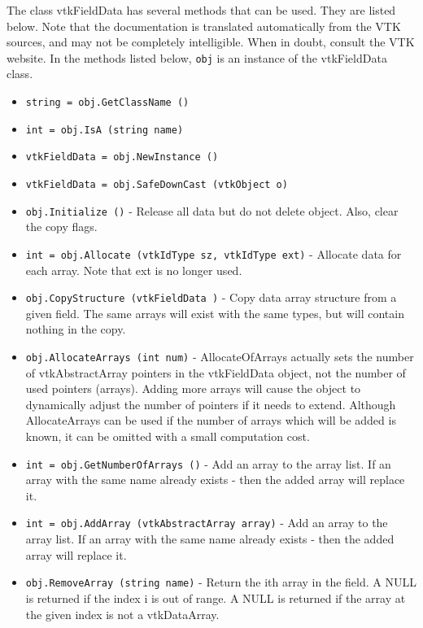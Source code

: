 The class vtkFieldData has several methods that can be used.
  They are listed below.
Note that the documentation is translated automatically from the VTK sources,
and may not be completely intelligible.  When in doubt, consult the VTK website.
In the methods listed below, \verb|obj| is an instance of the vtkFieldData class.
\begin{itemize}
\item  \verb|string = obj.GetClassName ()|

\item  \verb|int = obj.IsA (string name)|

\item  \verb|vtkFieldData = obj.NewInstance ()|

\item  \verb|vtkFieldData = obj.SafeDownCast (vtkObject o)|

\item  \verb|obj.Initialize ()| -  Release all data but do not delete object.
 Also, clear the copy flags.

\item  \verb|int = obj.Allocate (vtkIdType sz, vtkIdType ext)| -  Allocate data for each array.
 Note that ext is no longer used.

\item  \verb|obj.CopyStructure (vtkFieldData )| -  Copy data array structure from a given field.  The same arrays
 will exist with the same types, but will contain nothing in the
 copy.

\item  \verb|obj.AllocateArrays (int num)| -  AllocateOfArrays actually sets the number of
 vtkAbstractArray pointers in the vtkFieldData object, not the
 number of used pointers (arrays). Adding more arrays will
 cause the object to dynamically adjust the number of pointers
 if it needs to extend. Although AllocateArrays can
 be used if the number of arrays which will be added is
 known, it can be omitted with a small computation cost.

\item  \verb|int = obj.GetNumberOfArrays ()| -  Add an array to the array list. If an array with the same name
 already exists - then the added array will replace it.

\item  \verb|int = obj.AddArray (vtkAbstractArray array)| -  Add an array to the array list. If an array with the same name
 already exists - then the added array will replace it.

\item  \verb|obj.RemoveArray (string name)| -  Return the ith array in the field. A NULL is returned if the
 index i is out of range. A NULL is returned if the array at the given 
 index is not a vtkDataArray.


\end{itemize}
